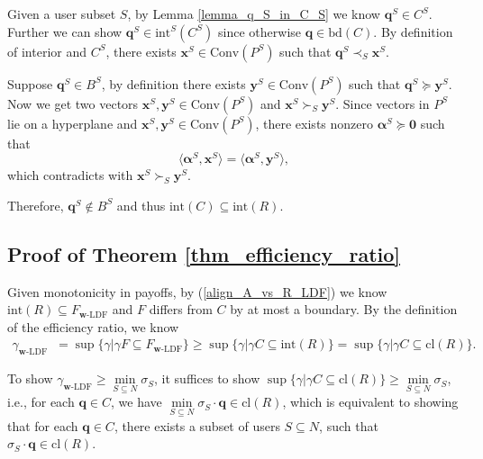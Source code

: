 \documentclass[prodmode,acmtompecs]{acmsmall}
\newcommand{\reqvec}{\mathbf{q}}
\newcommand{\concaveHull}{R}
\newcommand{\feasibilityRegion}{F}
\newcommand{\fullUserSet}{N}
\newcommand{\succS}[1]{\succ_{#1}}
\newcommand{\precS}[1]{\prec_{#1}}
\begin{document}
Given a user subset $S$, by Lemma \ref{lemma_q_S_in_C_S} we know $\reqvec^S \in C^S$. Further we can show $\reqvec^S \in \text{int}^S(C^S)$ since otherwise $\reqvec \in \text{bd}(C)$. By definition of interior and $C^S$, there exists $\mathbf{x}^S \in \text{Conv}(P^S)$ such that $\reqvec^S \precS{S} \mathbf{x}^S$.  

Suppose $\reqvec^S \in B^S$, by definition there exists $\mathbf{y}^S \in \text{Conv}(P^S)$ such that $\reqvec^S \succeq \mathbf{y}^S$. Now we get two vectors $\mathbf{x}^S, \mathbf{y}^S \in \text{Conv}(P^S)$ and $\mathbf{x}^S \succS{S} \mathbf{y}^S$. Since vectors in $P^S$ lie on a hyperplane and $\mathbf{x}^S, \mathbf{y}^S \in \text{Conv}(P^S)$, there exists nonzero $\boldsymbol{\alpha}^S \succeq \mathbf{0}$ such that
$$
\langle \boldsymbol{\alpha}^S, \mathbf{x}^S \rangle = \langle \boldsymbol{\alpha}^S, \mathbf{y}^S \rangle, 
$$
which contradicts with $\mathbf{x}^S \succS{S} \mathbf{y}^S$. 

Therefore, $\reqvec^S \notin B^S$ and thus $\text{int}(C) \subseteq \text{int}(\concaveHull)$. 

\subsection{Proof of Theorem \ref{thm_efficiency_ratio}}
\label{appendix_pf_thm_efficiency_ratio}

Given monotonicity in payoffs, by (\ref{align_A_vs_R_LDF}) we know $\text{int}(R) \subseteq \feasibilityRegion_{\mathbf{w}\text{-LDF}}$ and $\feasibilityRegion$ differs from $C$ by at most a boundary. By the definition of the efficiency ratio, we know
\begin{align*}
\gamma_{\mathbf{w}\text{-LDF}} & = \sup\{\gamma | \gamma \feasibilityRegion \subseteq \feasibilityRegion_{\mathbf{w}\text{-LDF}} \} \geq \sup\{\gamma | \gamma C \subseteq \text{int}(R) \} = \sup\{\gamma | \gamma C \subseteq \text{cl}(R) \}. 
\end{align*}

To show $\gamma_{\mathbf{w}\text{-LDF}} \geq \min\limits_{S \subseteq \fullUserSet}\sigma_S$, it suffices to show $\sup\{\gamma | \gamma C \subseteq \text{cl}(R) \} \geq \min\limits_{S \subseteq \fullUserSet}\sigma_S$, i.e., for each $\reqvec \in C$, we have $\min\limits_{S \subseteq \fullUserSet}\sigma_S \cdot \reqvec \in \text{cl}(R)$, which is equivalent to showing that for each $\reqvec \in C$, there exists a subset of users $S \subseteq \fullUserSet$, such that $\sigma_S \cdot \reqvec \in \text{cl}(R)$. 
\end{document}
